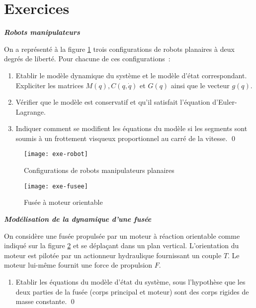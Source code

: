 \section{Exercices}

\begin{exercice}{\bf \em Robots manipulateurs}

On a représenté à la figure \ref{Fig:exe-robot} trois configurations de robots
planaires à deux degrés de liberté.  Pour chacune de ces
configurations~:
\begin{enumerate}
\item Etablir le modèle dynamique du système et le modèle
d'état correspondant.  Expliciter les matrices $M(q), C(q,\dot q)$
et $G(q)$ ainsi que le vecteur $g(q)$.
\item Vérifier que le modèle est conservatif et qu'il satisfait l'équation
d'Euler-Lagrange.
\item Indiquer comment se modifient les équations du modèle si
les segments sont soumis à un frottement visqueux proportionnel au
carré de la vitesse. \qed
\end{enumerate}
\begin{figure}[ht]
\begin{center}
\texttt{[image: exe-robot]}
\caption{Configurations de robots manipulateurs planaires}
\label{Fig:exe-robot}
\end{center}
\end{figure}
\end{exercice}
\vv
\begin{figure}[!h]
\begin{center}
\texttt{[image: exe-fusee]}
\caption{Fusée à moteur orientable}
\label{Fig:exe-fusee}
\end{center}
\end{figure}
\begin{exercice}{\bf \em Modélisation de la dynamique d'une fusée}

On considère une fusée propulsée par un moteur à réaction
orientable comme indiqué sur la figure \ref{Fig:exe-fusee} et se dépla\c
cant dans un plan vertical.  L'orientation du moteur est pilotée
par un actionneur hydraulique fournissant un couple $T$.  Le moteur
lui-même fournit une force de propulsion $F$.
\begin{enumerate}
\item Etablir les équations du modèle d'état du système,
sous l'hypothèse que les deux parties de la fusée (corps
principal et moteur) sont des corps rigides de masse constante. \qed
\end{enumerate}
\end{exercice}

